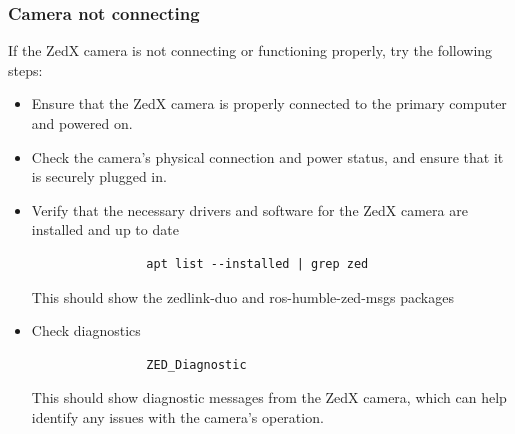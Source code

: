 \subsubsection{Camera not connecting}
If the ZedX camera is not connecting or functioning properly, try the following steps:
    \begin{itemize}
        \item Ensure that the ZedX camera is properly connected to the primary computer and powered on.
        \item Check the camera's physical connection and power status, and ensure that it is securely plugged in.
        \item Verify that the necessary drivers and software for the ZedX camera are installed and up to date \\
            \begin{verbatim}
                apt list --installed | grep zed
            \end{verbatim} 
            This should show the zedlink-duo and ros-humble-zed-msgs packages
        \item Check diagnostics
            \begin{verbatim}
                ZED_Diagnostic
            \end{verbatim} 
            This should show diagnostic messages from the ZedX camera, which can help identify any issues with the camera's operation.
    \end{itemize}

